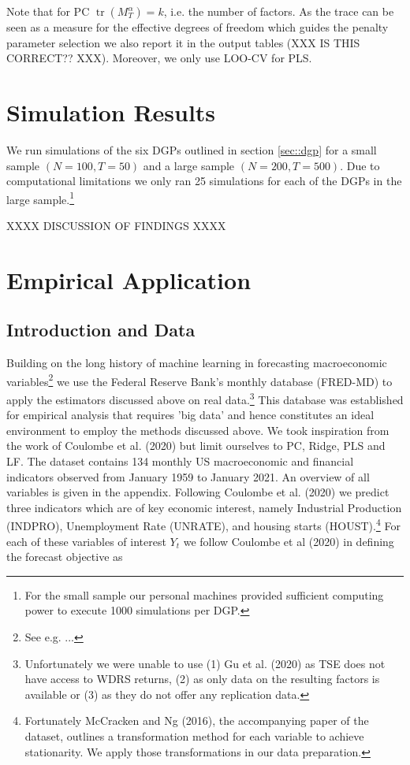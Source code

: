 Note that for PC $\operatorname{tr}\left(M_{T}^{\alpha}\right) = k$, i.e. the number of factors. As the trace can be seen as a measure for the effective degrees of freedom which guides the penalty parameter selection we also report it in the output tables (XXX IS THIS CORRECT?? XXX). Moreover, we only use LOO-CV for PLS.  


\section{Simulation Results}

We run simulations of the six DGPs outlined in section \ref{sec::dgp} for a small sample $(N = 100, T = 50)$ and a large sample $(N=200, T=500)$. Due to computational limitations we only ran 25 simulations for each of the DGPs in the large sample.\footnote{For the small sample our personal machines provided sufficient computing power to execute 1000 simulations per DGP.}

XXXX DISCUSSION OF FINDINGS XXXX


%
%

\clearpage

\section{Empirical Application}
\subsection{Introduction and Data}
Building on the long history of machine learning in forecasting macroeconomic variables\footnote{See e.g. ...} we use the Federal Reserve Bank's monthly database (FRED-MD) to apply the estimators discussed above on real data.\footnote{Unfortunately we were unable to use (1) Gu et al. (2020) as TSE does not have access to WDRS returns, (2) as only data on the resulting factors is available or (3) as they do not offer any replication data.} This database was established for empirical analysis that requires 'big data' and hence constitutes an ideal environment to employ the methods discussed above. We took inspiration from the work of Coulombe et al. (2020) but limit ourselves to PC, Ridge, PLS and LF. 
The dataset contains 134 monthly US macroeconomic and financial indicators observed from January 1959 to January 2021. An overview of all variables is given in the appendix. 
Following Coulombe et al. (2020) we predict three indicators which are of key economic interest, namely Industrial Production (INDPRO), Unemployment Rate (UNRATE), and housing starts (HOUST).\footnote{Fortunately McCracken and Ng (2016), the accompanying paper of the dataset, outlines a transformation method for each variable to achieve stationarity. We apply those transformations in our data preparation.}
For each of these variables of interest $Y_t$ we follow Coulombe et al (2020) in defining the forecast objective as

